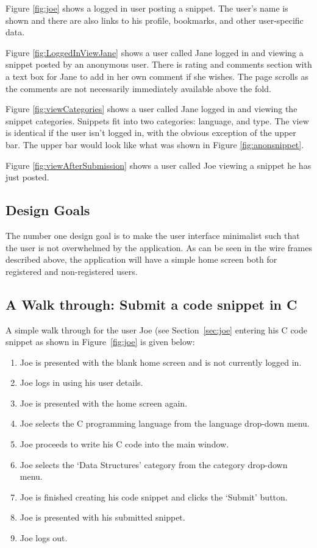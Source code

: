 \documentclass{sig-alt-release2}
\begin{document}
Figure \ref{fig:joe} shows a logged in user posting a snippet. The user's
name is shown and there are also links to his profile, bookmarks, and other
user-specific data.

Figure \ref{fig:LoggedInViewJane} shows a user called Jane logged in and viewing
a snippet posted by an anonymous user. There is rating and comments section
with a text box for Jane to add in her own comment if she wishes. The page
scrolls as the comments are not necessarily immediately available above the
fold.

Figure \ref{fig:viewCategories} shows a user called Jane logged in and viewing
the snippet categories. Snippets fit into two categories: language, and type.
The view is identical if the user isn't logged in, with the obvious exception
of the upper bar. The upper bar would look like what was shown in Figure
\ref{fig:anonsnippet}.

Figure \ref{fig:viewAfterSubmission} shows a user called Joe viewing a snippet
he has just posted.

\subsection{Design Goals}

The number one design goal is to make the user interface minimalist
such that the user is not overwhelmed by the application. As can be
seen in the wire frames described above, the application will have a simple
home screen both for registered and non-registered users.

\subsection{A Walk through: Submit a code snippet in C}
\label{sec:walkthrough}

A simple walk through for the user Joe (see Section~\ref{sec:joe}
entering his C code snippet as shown in Figure~\ref{fig:joe} is given
below:

\begin{enumerate}
\item Joe is presented with the blank home screen and is not currently logged
in.
\item Joe logs in using his user details.
\item Joe is presented with the home screen again.
\item Joe selects the C programming language from the language drop-down
menu.
\item Joe proceeds to write his C code into the main window.
\item Joe selects the `Data Structures' category from the category
drop-down menu.
\item Joe is finished creating his code snippet and clicks the `Submit'
button.
\item Joe is presented with his submitted snippet.
\item Joe logs out.
\end{enumerate}
\end{document}
